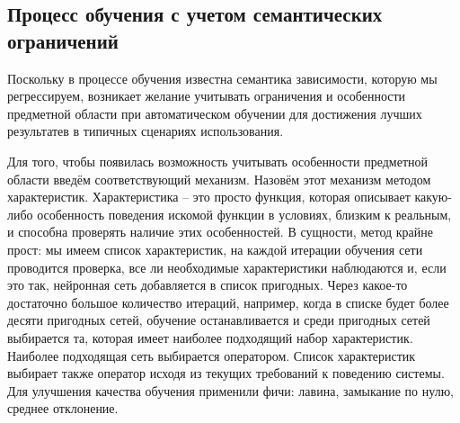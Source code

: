 \documentclass[14pt]{extreport}
\begin{document}
            \subsection{Процесс обучения с учетом семантических ограничений}
                Поскольку в процессе обучения известна семантика зависимости, которую мы регрессируем, возникает желание учитывать ограничения и особенности предметной области при автоматическом обучении для достижения лучших результатев в типичных сценариях использования.

                Для того, чтобы появилась возможность учитывать особенности предметной области введём соответствующий механизм. Назовём этот механизм методом характеристик.
                Характеристика -- это просто функция, которая описывает какую-либо особенность поведения искомой функции в условиях, близким к реальным, и способна проверять наличие этих особенностей.
                В сущности, метод крайне прост: мы имеем список характеристик, на каждой итерации обучения сети проводится проверка, все ли необходимые характеристики наблюдаются и, если это так, нейронная сеть добавляется в список пригодных. Через какое-то достаточно большое количество итераций, например, когда в списке будет более десяти пригодных сетей, обучение останавливается и среди пригодных сетей выбирается та, которая имеет наиболее подходящий набор характеристик. Наиболее подходящая сеть выбирается оператором. Список характеристик выбирает также оператор исходя из текущих требований к поведению системы.
                Для улучшения качества обучения применили фичи: лавина, замыкание по нулю, среднее отклонение.
                
\end{document}
